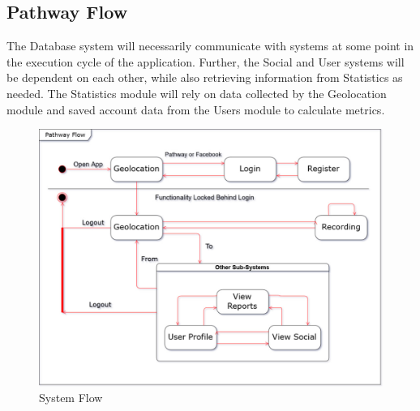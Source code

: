 \documentclass{article}
\begin{document}
\subsection{Pathway Flow}
The Database system will necessarily communicate with systems at some point in the execution cycle of the application. Further, the Social and User systems will be dependent on each other, while also retrieving information from Statistics as needed.
The Statistics module will rely on data collected by the Geolocation module and saved account data from the Users module to calculate metrics.

\begin{figure}[!htb]
    \centering
    \includegraphics[width=\textwidth]{systemFlow.jpg}
    \caption{System Flow}
    \label{fig:my_label}
\end{figure}
\end{document}
